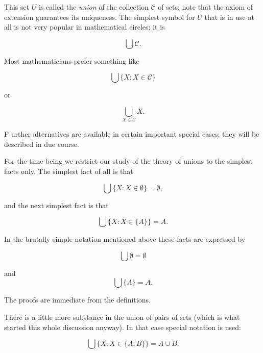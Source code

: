 This set $U$ is called the \textit{union} of the collection $\mathcal{C}$ of sets; note that the axiom of extension guarantees its uniqueness. The simplest symbol for $U$ that is in use at all is not very popular in mathematical circles; it is 

\begin{equation*}
\bigcup \mathcal{C}.
\end{equation*}

Most mathematicians prefer something like 

\begin{equation*}
\bigcup \{ X: X \in \mathcal{C} \}
\end{equation*}

or

\begin{equation*}
\bigcup_{X \in \mathcal{C}} X.
\end{equation*}

F urther alternatives are available in certain important special cases; they will be described in due course.

For the time being we restrict our study of the theory of unions to the simplest facts only. The simplest fact of all is that

\begin{equation*}
\bigcup \{ X: X \in \emptyset \} = \emptyset ,
\end{equation*}

and the next simplest fact is that 

\begin{equation*}
\bigcup \{ X: X \in \{ A \} \} = A.
\end{equation*}

In the brutally simple notation mentioned above these facts are expressed by

\begin{equation*}
\bigcup \emptyset = \emptyset
\end{equation*}

and
\begin{equation*}
\bigcup \{ A \} = A.
\end{equation*}

The proofs are immediate from the definitions.

There is a little more substance in the union of pairs of sets (which is what started this whole discussion anyway). In that case special notation is used: 

\begin{equation*}
\bigcup \{ X: X \in \{A, B \} \} = A \cup B.
\end{equation*}

